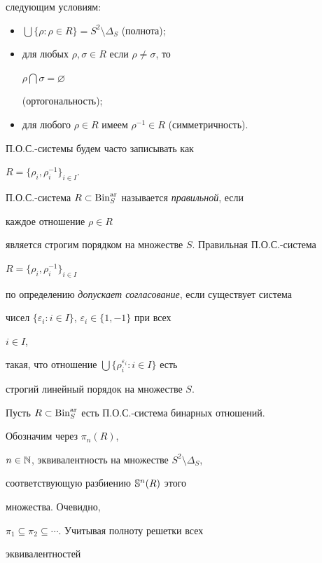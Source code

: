 следующим условиям:


\begin{itemize}


\item[1)] $\bigcup\{\rho:\rho\in R\}=S^2\setminus\Delta_S$ (полнота);


\item[2)] для любых $\rho,\sigma\in R$ если $\rho\ne\sigma$, то


$\rho\bigcap\sigma=\varnothing$


(ортогональность);


\item[3)] для любого $\rho\in R$ имеем $\rho^{-1}\in R$ (симметричность).


\end{itemize}


П.О.С.-системы будем часто записывать как


$R=\{\rho_i,\rho^{-1}_i\}_{i\in I}$.





П.О.С.-система $R\subset\operatorname{Bin}_S^{\mathrm{ar}}$ называется {\em правильной}, если


каждое отношение $\rho\in R$


является строгим порядком на множестве $S$. Правильная П.О.С.-система


$R=\{\rho_i,\rho^{-1}_i\}_{i\in I}$


по определению {\em допускает согласование}, если существует система


чисел $\{\varepsilon_i:i\in I\}$, $\varepsilon_i\in\{1,-1\}$ при всех


$i\in I$,


такая, что отношение $\bigcup\{\rho^{\varepsilon_i}_i:i\in I\}$ есть


строгий линейный порядок на множестве $S$.





Пусть $R\subset\operatorname{Bin}_S^{\mathrm{ar}}$ есть П.О.С.-система бинарных отношений.


Обозначим через $\pi_n(R)$,


$n\in\Bbb N$, эквивалентность на множестве $S^2\setminus\Delta_S$,


соответствующую разбиению $\Bbb S^n(R)$ этого


множества. Очевидно,


$\pi_1\subseteq\pi_2\subseteq\dotsb$. Учитывая полноту решетки всех


эквивалентностей


